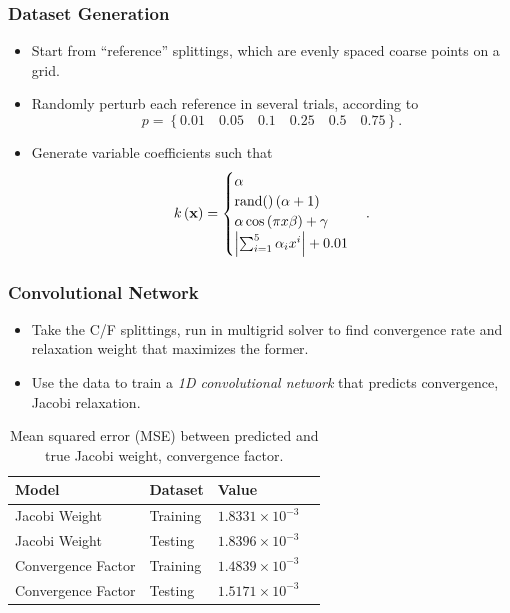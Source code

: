 \documentclass[handout]{beamer}
\renewcommand{\vec}[1]{ {\bf #1} }
\newcommand{\abs}[1]{ \left\lvert #1 \right\rvert }
\begin{document}
\begin{frame}
  \frametitle{Dataset Generation}
  \begin{itemize}
  \item Start from ``reference'' splittings, which are evenly spaced coarse points on a grid.
  \item Randomly perturb each reference in several trials, according to \[ p = \left\{ 0.01 \quad 0.05 \quad 0.1 \quad 0.25 \quad 0.5 \quad 0.75 \right\}. \]
  \item Generate variable coefficients such that \[ k\left(\vec{x}\right) = \begin{cases}
\alpha \\
\text{rand()}\left(\alpha + 1\right) \\
\alpha\cos\left(\pi x \beta\right) + \gamma \\
\abs{\sum_{i=1}^5 \alpha_i x^i} + 0.01
\end{cases}. \]
  \end{itemize}
\end{frame}


\begin{frame}
  \frametitle{Convolutional Network}
  \begin{itemize}
  \item Take the C/F splittings, run in multigrid solver to find convergence rate and relaxation weight that maximizes the former.
  \item Use the data to train a \textit{1D convolutional network} that predicts convergence, Jacobi relaxation.
  \end{itemize}

  \begin{table}[t]
\centering
\begin{tabular}{|l|l|l|l|}
\hline
Model & Dataset & Value \\

\hline
Jacobi Weight & Training & $1.8331 \times 10^{-3}$ \\
Jacobi Weight &  Testing & $1.8396 \times 10^{-3}$ \\
\hline
Convergence Factor & Training & $1.4839 \times 10^{-3}$ \\
Convergence Factor & Testing & $1.5171 \times 10^{-3}$ \\
\hline
\end{tabular}
\caption{Mean squared error (MSE) between predicted and true Jacobi weight, convergence factor.}
\label{tab:poisson_loss}
\end{table}
\end{frame}
\end{document}
